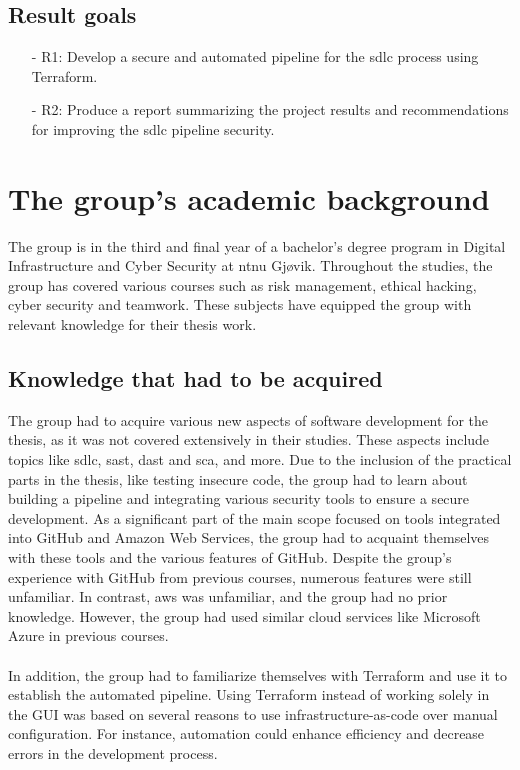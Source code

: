 \subsection{Result goals}
\begin{itemize}
    
    \item[-] R1: Develop a secure and automated pipeline for the \acrshort{sdlc} process using Terraform. 
    
    \item[-] R2: Produce a report summarizing the project results and recommendations for improving the \acrshort{sdlc} pipeline security.
    
\end{itemize}


\section{The group's academic background}
The group is in the third and final year of a bachelor's degree program in Digital Infrastructure and Cyber Security at \acrshort{ntnu} Gjøvik. Throughout the studies, the group has covered various courses such as risk management, ethical hacking, cyber security and teamwork. These subjects have equipped the group with relevant knowledge for their thesis work.

\subsection{Knowledge that had to be acquired}
\label{section: Knowledge that had to be acquired}
The group had to acquire various new aspects of software development for the thesis, as it was not covered extensively in their studies. These aspects include topics like \acrshort{sdlc}, \acrlong{sast}, \acrlong{dast} and \acrlong{sca}, and more. Due to the inclusion of the practical parts in the thesis, like testing insecure code, the group had to learn about building a pipeline and integrating various security tools to ensure a secure development. As a significant part of the main scope focused on tools integrated into GitHub and Amazon Web Services, the group had to acquaint themselves with these tools and the various features of GitHub. Despite the group's experience with GitHub from previous courses, numerous features were still unfamiliar. In contrast, \acrshort{aws} was unfamiliar, and the group had no prior knowledge. However, the group had used similar cloud services like Microsoft Azure in previous courses.
\\~\\
In addition, the group had to familiarize themselves with Terraform and use it to establish the automated pipeline. Using Terraform instead of working solely in the GUI was based on several reasons to use infrastructure-as-code over manual configuration. For instance, automation could enhance efficiency and decrease errors in the development process.

